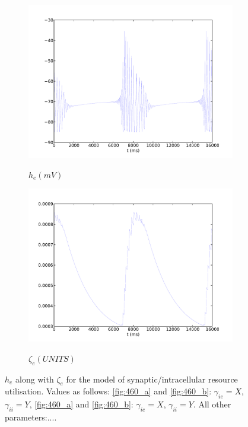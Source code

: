 \documentclass[a4paper,12pt]{article}
\begin{document}
\begin{figure}
\begin{subfigure}[b]{0.5\textwidth}
		\includegraphics[scale=0.35]{chosen-frontiers-2012/00460-0_7-he-intra.pdf}
		\label{fig:460_c}
		\caption{$h_e (mV)$}
	\end{subfigure}
	\begin{subfigure}[b]{0.5\textwidth}
		\includegraphics[scale=0.35]{chosen-frontiers-2012/00460-0_7-slow-intra.pdf}
		\label{fig:460_d}
		\caption{$\zeta_e (UNITS)$}
	\end{subfigure}
	\caption{$h_e$ along with $\zeta_e$ for the model of synaptic/intracellular resource utilisation. 
	Values as follows:
	\ref{fig:460_a} and \ref{fig:460_b}: $\gamma_{ie}=X$, $\gamma_{ii}=Y$, \ref{fig:460_a} and \ref{fig:460_b}:  $\gamma_{ie}=X$, $\gamma_{ii}=Y$. 
	All other parameters:....}
\end{figure}
\end{document}
